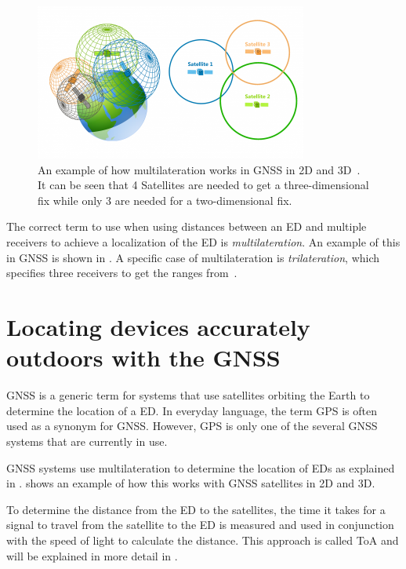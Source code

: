 \begin{figure}[htbp]
    \centering
    \includegraphics[width=0.8\textwidth]{pictures/multilateration/gps_multilateration.png}
    \caption[Example of how multilateration works in the \acl{GNSS} in 2D and 3D]{
        An example of how multilateration works in \ac{GNSS} in 2D and 3D~\protect\cite{gisgeography_how_2018}.
        It can be seen that 4 Satellites are needed to get a three-dimensional fix while only 3 are needed for a two-dimensional fix.
    }\label{pic:multilateration-gps-2d-3d-example}
\end{figure}

The correct term to use when using distances between an \acl{ED} and multiple receivers to achieve a localization of the \acl{ED} is \emph{multilateration}.
An example of this in \ac{GNSS} is shown in .
A specific case of multilateration is \emph{trilateration}, which specifies three receivers to get the ranges from~\cite{ruiz_efficient_2013}.

\section{Locating devices accurately outdoors with the \acl{GNSS}}

\ac{GNSS} is a generic term for systems that use satellites orbiting the Earth to determine the location of a \acl{ED}.
In everyday language, the term \ac{GPS} is often used as a synonym for \ac{GNSS}.
However, \ac{GPS} is only one of the several \ac{GNSS} systems that are currently in use.

\ac{GNSS} systems use multilateration to determine the location of \aclp{ED} as explained in .
 shows an example of how this works with \ac{GNSS} satellites in 2D and 3D.

To determine the distance from the \acl{ED} to the satellites, the time it takes for a signal to travel from the satellite to the \acl{ED} is measured and used in conjunction with the speed of light to calculate the distance.
This approach is called \acf{ToA} and will be explained in more detail in .

